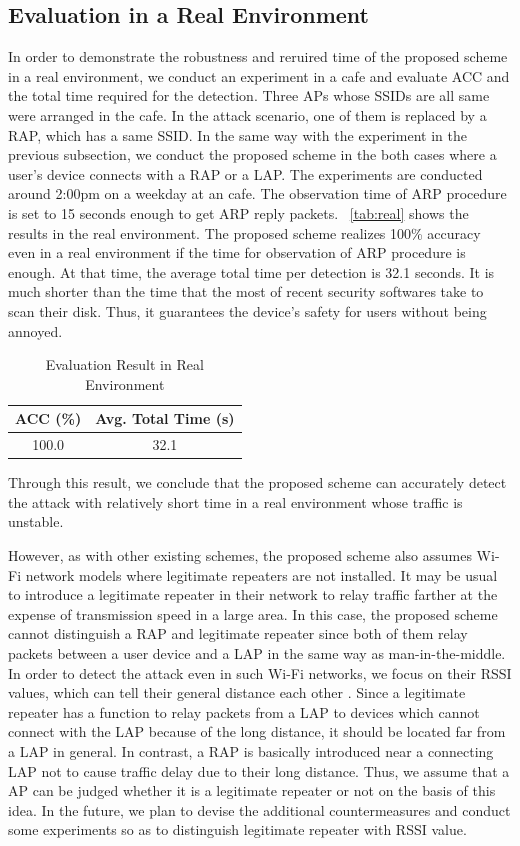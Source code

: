 \documentclass[conference]{IEEEtran}
\begin{document}
\subsection{Evaluation in a Real Environment}
In order to demonstrate the robustness and reruired time of the proposed scheme in a real environment, we conduct an experiment in a cafe and evaluate ACC and the total time required for the detection.
Three APs whose SSIDs are all same were arranged in the cafe.
In the attack scenario, one of them is replaced by a RAP, which has a same SSID.
In the same way with the experiment in the previous subsection, we conduct the proposed scheme in the both cases where a user's device connects with a RAP or a LAP.
The experiments are conducted around 2:00pm on a weekday at an cafe.
The observation time of ARP procedure is set to 15 seconds enough to get ARP reply packets.
\tablename~\ref{tab:real} shows the results in the real environment.
The proposed scheme realizes 100\% accuracy even in a real environment if the time for observation of ARP procedure is enough.
At that time, the average total time per detection is 32.1 seconds.
It is much shorter than the time that the most of recent security softwares take to scan their disk.
Thus, it guarantees the device's safety for users without being annoyed.
\begin{table}[t] 
    \begin{center}
        \caption{Evaluation Result in Real Environment}
        \begin{tabular}{c c} \hline
            ACC (\%) & Avg. Total Time (s) \\ \hline \hline
            100.0 & 32.1 \\ \hline
        \end{tabular}
    \end{center}
\end{table}
Through this result, we conclude that the proposed scheme can accurately detect the attack with relatively short time in a real environment whose traffic is unstable.

However, as with other existing schemes, the proposed scheme also assumes Wi-Fi network models where legitimate repeaters are not installed.
It may be usual to introduce a legitimate repeater in their network to relay traffic farther at the expense of transmission speed in a large area.
In this case, the proposed scheme cannot distinguish a RAP and legitimate repeater since both of them relay packets between a user device and a LAP in the same way as man-in-the-middle.
In order to detect the attack even in such Wi-Fi networks, we focus on their RSSI values, which can tell their general distance each other \cite{rssi}.
Since a legitimate repeater has a function to relay packets from a LAP to devices which cannot connect with the LAP because of the long distance, it should be located far from a LAP in general.
In contrast, a RAP is basically introduced near a connecting LAP not to cause traffic delay due to their long distance.
Thus, we assume that a AP can be judged whether it is a legitimate repeater or not on the basis of this idea.
In the future, we plan to devise the additional countermeasures and conduct some experiments so as to distinguish legitimate repeater with RSSI value.
\end{document}
